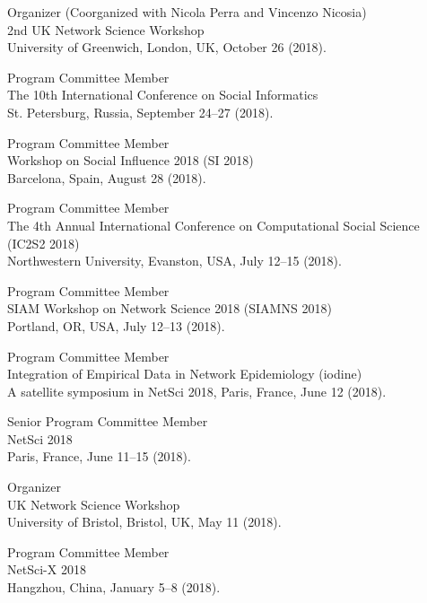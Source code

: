 \documentclass[11pt,letter]{article}
\renewenvironment{itemize}{
  \begin{list}{}{
    \setlength{\leftmargin}{1.5em}
    \setlength{\itemsep}{0.25em}
    \setlength{\parskip}{0pt}
    \setlength{\parsep}{0.25em}
  }
}{
  \end{list}
}
\begin{document}
\begin{itemize}
\item Organizer (Coorganized with Nicola Perra and Vincenzo Nicosia)\\
2nd UK Network Science Workshop\\
University of Greenwich, London, UK, October 26 (2018).

\item Program Committee Member\\
The 10th International Conference on Social Informatics\\
St. Petersburg, Russia, September 24--27 (2018).

\item Program Committee Member\\
Workshop on Social Influence 2018 (SI 2018)\\
Barcelona, Spain, August 28 (2018).

\item Program Committee Member\\
The 4th Annual International Conference on Computational Social Science (IC2S2 2018)\\
Northwestern University, Evanston, USA, July 12--15 (2018).

\item Program Committee Member\\
SIAM Workshop on Network Science 2018 (SIAMNS 2018)\\
Portland, OR, USA, July 12--13 (2018).

\item Program Committee Member\\
Integration of Empirical Data in Network Epidemiology (iodine)\\
A satellite symposium in NetSci 2018, Paris, France, June 12 (2018).

\item Senior Program Committee Member\\
NetSci 2018\\
Paris, France, June 11--15 (2018).

\item Organizer\\
UK Network Science Workshop\\
University of Bristol, Bristol, UK, May 11 (2018).

\item Program Committee Member\\
NetSci-X 2018\\
Hangzhou, China, January 5--8 (2018).


\end{itemize}
\end{document}
